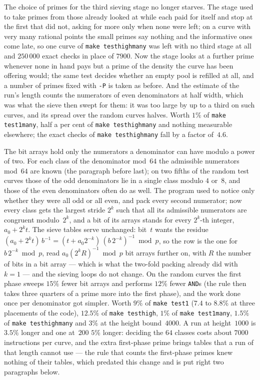 \documentclass[12pt,a4paper,oneside]{amsart}
\begin{document}
The choice of primes for the third sieving stage no longer starves. The
stage used to take primes from those already looked at while each paid for
itself and stop at the first that did not, asking for more only when none
were left; on a curve with very many rational points the small primes say
nothing and the informative ones come late, so one curve of \texttt{make
testhighmany} was left with no third stage at all and $250\,000$ exact
checks in place of $7900$. Now the stage looks at a further prime whenever
none in hand pays but a prime of the density the curve has been offering
would; the same test decides whether an empty pool is refilled at all, and
a number of primes fixed with \verb+-P+ is taken as before. And the estimate of the run's length counts the numerators of even
denominators at half width, which was what the sieve then swept for them: it was
too large by up to a third on such curves, and its spread over the random
curves halves. Worth $1\%$ of \texttt{make test1many}, half a per cent of
\texttt{make testhighmany} and nothing measurable elsewhere; the exact
checks of \texttt{make testhighmany} fall by a factor of~$4.6$.

The bit arrays hold only the numerators a denominator can have modulo a
power of two. For each class of the denominator mod~$64$ the admissible
numerators mod~$64$ are known (the paragraph before last); on two fifths of
the random test curves those of the odd denominators lie in a single class
modulo $4$ or~$8$, and those of the even denominators often do as well. The
program used to notice only whether they were all odd or all even, and pack
every second numerator; now every class gets the largest stride $2^k$ such
that all its admissible numerators are congruent modulo~$2^k$, and a bit of
its arrays stands for every $2^k$-th integer, $a_0 + 2^k t$. The sieve
tables serve unchanged: bit~$t$ wants the residue $(a_0 + 2^k t)\, b^{-1} =
(t + a_0 2^{-k})\, (b\, 2^{-k})^{-1} \bmod p$, so the row is the one for
$b\, 2^{-k} \bmod p$, read $a_0 (2^k R)^{-1} \bmod p$ bit arrays further on,
with $R$ the number of bits in a bit array --- which is what the two-fold
packing already did with $k = 1$ --- and the sieving loops do not change.
On the random curves the first phase sweeps $15\%$ fewer bit arrays and
performs $12\%$ fewer \texttt{AND}s (the rule then takes three quarters of
a prime more into the first phase), and the work done once per denominator
got simpler. Worth $9\%$ of \texttt{make test1} ($7.4$ to $8.8\%$ at three
placements of the code), $12.5\%$ of \texttt{make testhigh}, $1\%$ of
\texttt{make test1many}, $1.5\%$ of \texttt{make testhighmany} and $3\%$ at
the height bound~$4000$. A run at height~$1000$ is $3.5\%$ longer and one
at~$200$ $5\%$ longer: deciding the $64$ classes costs about $7000$
instructions per curve, and the extra first-phase prime brings tables that
a run of that length cannot use --- the rule that counts the first-phase
primes knew nothing of their tables, which predated this change and is put
right two paragraphs below.
\end{document}
